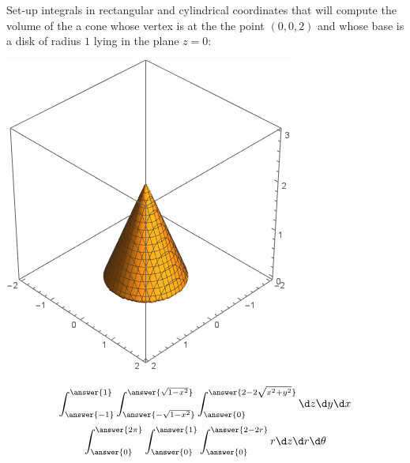 \documentclass{ximera}
\author{Bart Snapp}
\begin{document}
\begin{exercise}
  Set-up integrals in rectangular and cylindrical coordinates that
  will compute the volume of the a cone whose vertex is at the the
  point $(0,0,2)$ and whose base is a disk of radius $1$ lying in the
  plane $z=0$:
  \begin{image}
    \includegraphics{cone2.png}
  \end{image}
  \begin{prompt}
  \[
  \int_{\answer{-1}}^{\answer{1}}\int_{\answer{-\sqrt{1-x^2}}}^{\answer{\sqrt{1-x^2}}}\int_{\answer{0}}^{\answer{2-2\sqrt{x^2+y^2}}}\d z \d y \d x
  \]
  \[
  \int_{\answer{0}}^{\answer{2\pi}}\int_{\answer{0}}^{\answer{1}}\int_{\answer{0}}^{\answer{2-2r}}   r\d z \d r \d \theta
  \]
  \end{prompt}
\end{exercise}
\end{document}
